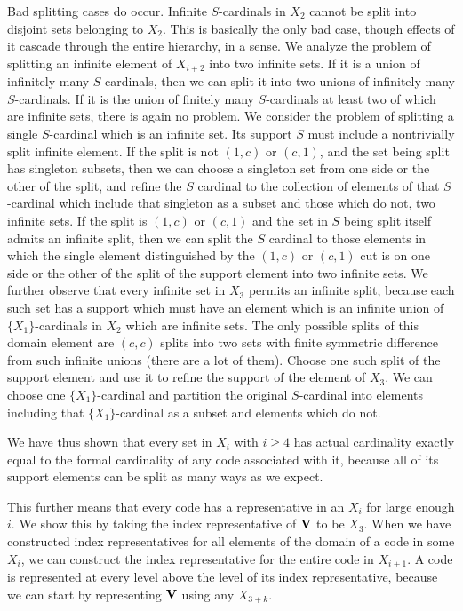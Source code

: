 \documentclass{article}
\begin{document}
\begin{description}
Bad splitting cases do occur.  Infinite $S$-cardinals in $X_2$ cannot be split into disjoint sets belonging to $X_2$.  This is basically the only bad case, though effects of it cascade through the entire hierarchy, in a sense.  We analyze the problem of splitting an infinite element of $X_{i+2}$ into two infinite sets.  If it is a union of infinitely many $S$-cardinals, then we can split it into two unions
of infinitely many $S$-cardinals.  If it is the union of finitely many $S$-cardinals at least two of which are infinite sets, there is again no problem.  We consider the problem of splitting a single $S$-cardinal which is an infinite set.  Its support $S$ must include a nontrivially split infinite element.  If the split is not $(1,c)$ or $(c,1)$, and the set being split has singleton subsets, then we can choose a singleton set from
one side or the other of the split, and refine the $S$ cardinal to the collection of elements of that $S$-cardinal which include that singleton as a subset and those which do not, two infinite sets.
If the split is $(1,c)$ or $(c,1)$ and the set in $S$ being split itself admits an infinite split, then we can split the $S$ cardinal to those elements in which the single element distinguished by the $(1,c)$
or $(c,1)$ cut is on one side or the other of the split of the support element into two infinite sets.  We further observe that every infinite set in $X_3$ permits an infinite split,
because each such set has a support which must have an element which is an infinite union of $\{X_1\}$-cardinals in $X_2$ which are infinite sets.  The only possible splits of this domain element
are $(c,c)$ splits into two sets with finite symmetric difference from such infinite unions (there are a lot of them).   Choose one such split of the support element and use it to refine the support of the element of $X_3$.  We can choose one $\{X_1\}$-cardinal and partition the original $S$-cardinal into elements including that $\{X_1\}$-cardinal as a subset and elements which do not.

We have thus shown that every set in $X_i$ with $i \geq 4$ has actual cardinality exactly equal to the formal cardinality of any code associated with it, because all of its support elements
can be split as many ways as we expect.

This further means that every code has a representative in an $X_i$ for large enough $i$.  We show this by taking the index representative of ${\bf V}$ to be $X_3$.  When we have constructed index
representatives for all elements of the domain of a code in some $X_i$, we can construct the index representative for the entire code in $X_{i+1}$.  A code is represented at every level above
the level of its index representative, because we can start by representing ${\bf V}$ using any $X_{3+k}$.


\end{description}
\end{document}
